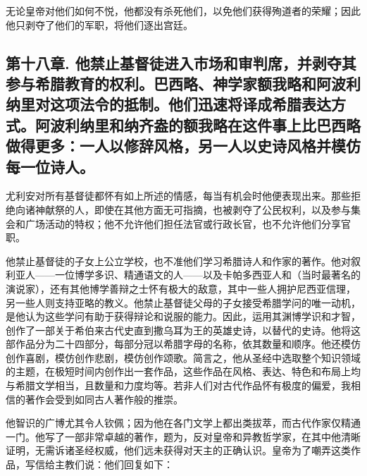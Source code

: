 无论皇帝对他们如何不悦，他都没有杀死他们，以免他们获得殉道者的荣耀；因此他只剥夺了他们的军职，将他们逐出宫廷。\par


\subsection{第十八章. 他禁止基督徒进入市场和审判席，并剥夺其参与希腊教育的权利。巴西略、神学家额我略和阿波利纳里对这项法令的抵制。他们迅速将译成希腊表达方式。阿波利纳里和纳齐盎的额我略在这件事上比巴西略做得更多：一人以修辞风格，另一人以史诗风格并模仿每一位诗人。}

尤利安对所有基督徒都怀有如上所述的情感，每当有机会时他便表现出来。那些拒绝向诸神献祭的人，即使在其他方面无可指摘，也被剥夺了公民权利，以及参与集会和广场活动的特权；他不允许他们担任法官或行政长官，也不允许他们分享官职。\par

他禁止基督徒的子女上公立学校，也不准他们学习希腊诗人和作家的著作。他对叙利亚人——一位博学多识、精通语文的人——以及卡帕多西亚人和（当时最著名的演说家），还有其他博学善辩之士怀有极大的敌意，其中一些人拥护尼西亚信理，另一些人则支持亚略的教义。他禁止基督徒父母的子女接受希腊学问的唯一动机，是他认为这些学问有助于获得辩论和说服的能力。因此，运用其渊博学识和才智，创作了一部关于希伯来古代史直到撒乌耳为王的英雄史诗，以替代的史诗。他将这部作品分为二十四部分，每部分冠以希腊字母的名称，依其数量和顺序。他还模仿创作喜剧，模仿创作悲剧，模仿创作颂歌。简言之，他从圣经中选取整个知识领域的主题，在极短时间内创作出一套作品，这些作品在风格、表达、特色和布局上均与希腊文学相当，且数量和力度均等。若非人们对古代作品怀有极度的偏爱，我相信的著作会受到如同古人著作般的推崇。\par

他智识的广博尤其令人钦佩；因为他在各门文学上都出类拔萃，而古代作家仅精通一门。他写了一部非常卓越的著作，题为，反对皇帝和异教哲学家，在其中他清晰证明，无需诉诸圣经权威，他们远未获得对天主的正确认识。皇帝为了嘲弄这类作品，写信给主教们说：他们回复如下：\par

